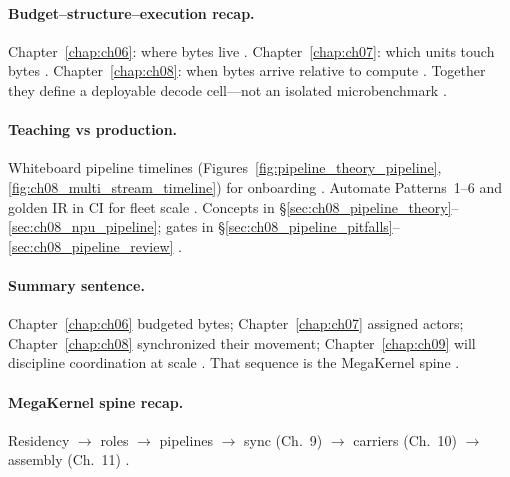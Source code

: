 \paragraph{Budget--structure--execution recap.}
Chapter~\ref{chap:ch06}: where bytes live \citep{dao2022flashattention,yirage2026,chen2020compilerbasedhardw}.
Chapter~\ref{chap:ch07}: which units touch bytes \citep{shah2024flashattention3,mpk2025,patel2025llminference}.
Chapter~\ref{chap:ch08}: when bytes arrive relative to compute \citep{semianalysis2024tma,amd2024aie,nvidia2022hopper}.
Together they define a deployable decode cell---not an isolated microbenchmark \citep{taxbreak2026,memoryfloor2026}.

\paragraph{Teaching vs production.}
Whiteboard pipeline timelines (Figures~\ref{fig:pipeline_theory_pipeline}, \ref{fig:ch08_multi_stream_timeline}) for onboarding \citep{shah2024flashattention3,dlbook}.
Automate Patterns~1--6 and golden IR in CI for fleet scale \citep{yirage2026,patel2025llminference,mpk2025}.
Concepts in \S\ref{sec:ch08_pipeline_theory}--\ref{sec:ch08_npu_pipeline}; gates in \S\ref{sec:ch08_pipeline_pitfalls}--\ref{sec:ch08_pipeline_review} \citep{chen2020compilerbasedhardw,taxbreak2026}.

\paragraph{Summary sentence.}
Chapter~\ref{chap:ch06} budgeted bytes; Chapter~\ref{chap:ch07} assigned actors; Chapter~\ref{chap:ch08} synchronized their movement; Chapter~\ref{chap:ch09} will discipline coordination at scale \citep{dao2022flashattention,semianalysis2024tma,yirage2026,shah2024flashattention3}.
That sequence is the MegaKernel spine \citep{mpk2025,wu2024mirage,memoryfloor2026,patel2025llminference,taxbreak2026,chen2020compilerbasedhardw}.

\paragraph{MegaKernel spine recap.}
Residency $\rightarrow$ roles $\rightarrow$ pipelines $\rightarrow$ sync (Ch.~9) $\rightarrow$ carriers (Ch.~10) $\rightarrow$ assembly (Ch.~11) \citep{dao2022flashattention,mpk2025,wu2024mirage,amd2024xdna,nvidia2022hopper,kwon2023vllm,dlbook,amd2024aie,rotem2018glow,liu2024deepseekv3,dao2023flashdecoding,nvidia2024cudagraphs}.

